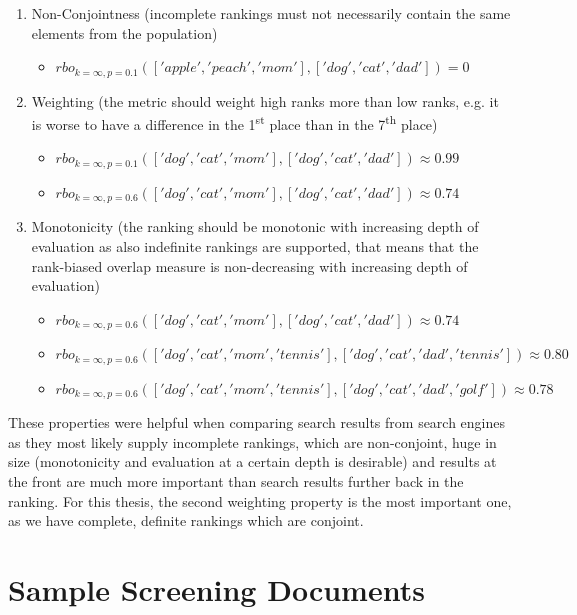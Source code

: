 \documentclass[draft,final]{thesisclass} %
\begin{document}
\begin{enumerate}
\item Non-Conjointness (incomplete rankings must not necessarily contain the same elements from the population)
\begin{itemize}
    \item $rbo_{k=\infty,p=0.1}(['apple','peach','mom'],['dog','cat','dad']) = 0$
\end{itemize}
\item Weighting (the metric should weight high ranks more than low ranks, e.g. it is worse to have a difference in the 1\textsuperscript{st} place than in the 7\textsuperscript{th} place)
\begin{itemize}
    \item $rbo_{k=\infty,p=0.1}(['dog','cat','mom'],['dog','cat','dad']) \approx 0.99$
    \item $rbo_{k=\infty,p=0.6}(['dog','cat','mom'],['dog','cat','dad']) \approx 0.74$
\end{itemize}
\item Monotonicity (the ranking should be monotonic with increasing depth of evaluation as also indefinite rankings are supported, that means that the rank-biased overlap measure is non-decreasing with increasing depth of evaluation)
\begin{itemize}
    \item $rbo_{k=\infty,p=0.6}(['dog','cat','mom'],['dog','cat','dad']) \approx 0.74$
    \item $rbo_{k=\infty,p=0.6}(['dog','cat','mom','tennis'],['dog','cat','dad','tennis']) \approx 0.80$
    \item $rbo_{k=\infty,p=0.6}(['dog','cat','mom','tennis'],['dog','cat','dad','golf']) \approx 0.78$
\end{itemize}
\end{enumerate}
These properties were helpful when comparing search results from search engines as they most likely supply incomplete rankings, which are non-conjoint, huge in size (monotonicity and evaluation at a certain depth is desirable) and results at the front are much more important than search results further back in the ranking.
For this thesis, the second weighting property is the most important one, as we have complete, definite rankings which are conjoint.

\section{Sample Screening Documents} \label{sample_screening_documents}
\end{document}
